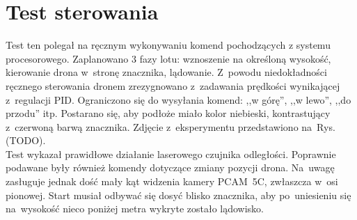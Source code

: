 \section{Test sterowania}
\label{sec:test_sterowania}
Test ten polegał na ręcznym wykonywaniu komend pochodzących z systemu procesorowego. Zaplanowano 3 fazy lotu: wznoszenie na określoną wysokość, kierowanie drona w~stronę znacznika, lądowanie. Z~powodu niedokładności ręcznego sterowania dronem zrezygnowano z~zadawania prędkości wynikającej z~regulacji PID. Ograniczono się do wysyłania komend: ,,w górę'', ,,w lewo'', ,,do przodu'' itp. Postarano się, aby podłoże miało kolor niebieski, kontrastujący z~czerwoną barwą znacznika. Zdjęcie z~eksperymentu przedstawiono na~Rys. (TODO).\\
Test wykazał prawidłowe działanie laserowego czujnika odległości. Poprawnie podawane były również komendy dotyczące zmiany pozycji drona. Na~uwagę zasługuje jednak dość mały kąt widzenia kamery PCAM~5C, zwłaszcza w~osi pionowej. Start musiał odbywać się dosyć blisko znacznika, aby po~uniesieniu się na~wysokość nieco poniżej metra wykryte zostało lądowisko.

